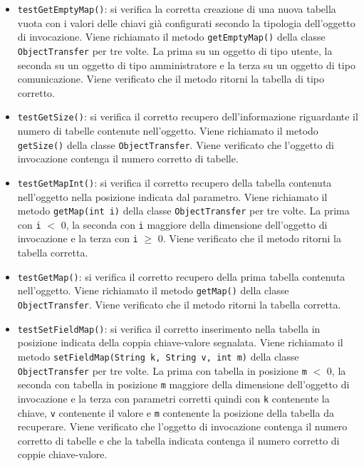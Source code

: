 {{\begin{itemize}
\begin{itemize}
\begin{itemize}
						\item \texttt{testGetEmptyMap()}: si verifica la corretta creazione di una nuova tabella vuota con i valori delle chiavi già configurati secondo la tipologia dell'oggetto di invocazione. Viene richiamato il metodo \texttt{getEmptyMap()} della classe \texttt{ObjectTransfer} per tre volte. La prima su un oggetto di tipo utente, la seconda su un oggetto di tipo amministratore e la terza su un oggetto di tipo comunicazione. Viene verificato che il metodo ritorni la tabella di tipo corretto.
						
						\item \texttt{testGetSize()}: si verifica il corretto recupero dell'informazione \newline riguardante il numero di tabelle contenute nell'oggetto. Viene richiamato il metodo \texttt{getSize()} della classe \texttt{ObjectTransfer}. Viene verificato che l'oggetto di invocazione contenga il numero corretto di tabelle.
						
						\item \texttt{testGetMapInt()}: si verifica il corretto recupero della tabella contenuta nell'oggetto nella posizione indicata dal parametro. Viene richiamato il metodo \texttt{getMap(int i)} della classe \texttt{ObjectTransfer} per tre volte. La prima con \texttt{i} $<$ 0, la seconda con \texttt{i} maggiore della dimensione dell'oggetto di invocazione e la terza con \texttt{i} $\geq$ 0. Viene verificato che il metodo ritorni la tabella corretta.
						
						\item \texttt{testGetMap()}: si verifica il corretto recupero della prima tabella contenuta nell'oggetto. Viene richiamato il metodo \texttt{getMap()} della classe \texttt{ObjectTransfer}. Viene verificato che il metodo ritorni la tabella corretta.
						
						\item \texttt{testSetFieldMap()}: si verifica il corretto inserimento nella tabella in posizione indicata della coppia chiave-valore segnalata. Viene richiamato il metodo \texttt{setFieldMap(String k, String v, int m)} della classe \texttt{ObjectTransfer} per tre volte. La prima con tabella in posizione \newline \texttt{m} $<$ 0, la seconda con tabella in posizione \texttt{m} maggiore della dimensione dell'oggetto di invocazione e la terza con parametri corretti quindi con \texttt{k} contenente la chiave, \texttt{v} contenente il valore e \texttt{m} contenente la posizione della tabella da recuperare. Viene verificato che l'oggetto di invocazione contenga il numero corretto di tabelle e che la tabella indicata contenga il numero corretto di coppie chiave-valore.
	 

\end{itemize}
\end{itemize}
\end{itemize}}}
